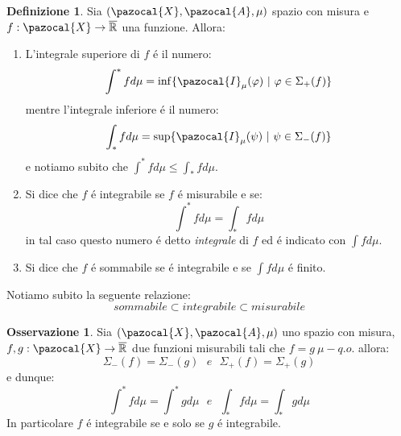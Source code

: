 \documentclass[11pt,a4paper]{report}
\theoremstyle{plain}
\theoremstyle{definition}
\newtheorem{defn}[thm]{Definizione} %
\newtheorem{oss}[thm]{Osservazione} %
\newcommand{\X}{\pazocal{X}}
\newcommand{\I}{\pazocal{I}}
\newcommand{\A}{\pazocal{A}}
\begin{document}
\begin{defn}
	Sia $(\X,\A,\mu)$ spazio con misura e $f: \X \rightarrow \overline{\mathbb{R}}$ una funzione. Allora:
	\begin{enumerate}
		\item L'integrale superiore di $f$ \'e il numero:
			\[
				\int^*fd\mu	 = \inf\{\I_\mu(\varphi)\ |\ \varphi \in \Sigma_+(f)\}		
			\]
			mentre l'integrale inferiore \'e il numero:
			\[
				\int_*fd\mu	 = \sup\{\I_\mu(\psi)\ |\ \psi \in \Sigma_-(f)\}		
			\]
			e notiamo subito che $\int^*fd\mu \le \int_*fd\mu$.
		\item Si dice che $f$ \'e integrabile se $f$ \'e  misurabile e se:
			\[
				\int^*fd\mu = \int_*fd\mu			
			\] 
			in tal caso questo numero \'e detto \textit{integrale} di $f$ ed \'e indicato con $\int fd\mu$.
		\item Si dice che $f$ \'e sommabile se \'e integrabile e se $\int fd\mu$ \'e finito.
	\end{enumerate}
\end{defn}

Notiamo subito la seguente relazione:
\[
	sommabile \subset integrabile \subset misurabile
\]

\begin{oss}
	Sia $(\X,\A,\mu)$ uno spazio con misura, $f,g : \X \rightarrow \overline{\mathbb{R}}$ due funzioni misurabili tali che $f = g\ \mu-q.o.$ allora:
	\[
		\Sigma_-(f) = \Sigma_-(g)\ \ \ e\ \ \ \Sigma_+(f) = \Sigma_+(g)
	\]
	e dunque:
	\[
		\int^*fd\mu	 = \int^*gd\mu\ \ \ e \ \ \ \int_*fd\mu = \int_*gd\mu		
	\]
	In particolare $f$ \'e  integrabile se e solo se $g$ \'e  integrabile.
\end{oss}
\end{document}
